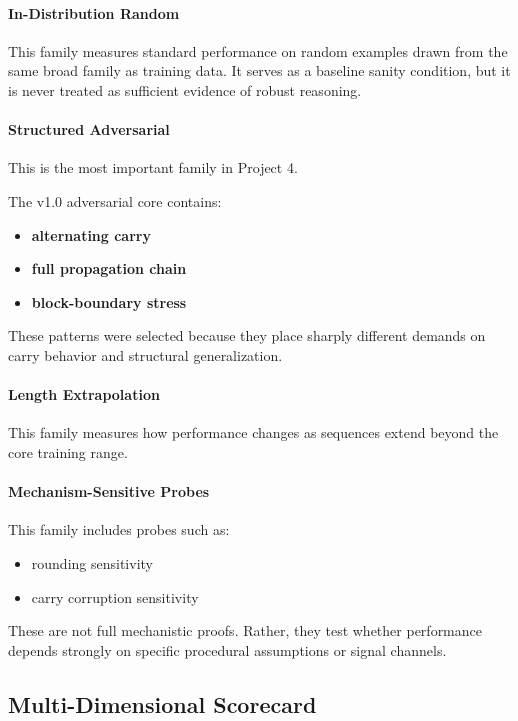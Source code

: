 \documentclass[11pt]{article}
\begin{document}
\paragraph{In-Distribution Random}
This family measures standard performance on random examples drawn from the same broad family as training data. It serves as a baseline sanity condition, but it is never treated as sufficient evidence of robust reasoning.

\paragraph{Structured Adversarial}
This is the most important family in Project 4.

The v1.0 adversarial core contains:
\begin{itemize}[leftmargin=1.5em]
    \item \textbf{alternating carry}
    \item \textbf{full propagation chain}
    \item \textbf{block-boundary stress}
\end{itemize}

These patterns were selected because they place sharply different demands on carry behavior and structural generalization.

\paragraph{Length Extrapolation}
This family measures how performance changes as sequences extend beyond the core training range.

\paragraph{Mechanism-Sensitive Probes}
This family includes probes such as:
\begin{itemize}[leftmargin=1.5em]
    \item rounding sensitivity
    \item carry corruption sensitivity
\end{itemize}

These are not full mechanistic proofs. Rather, they test whether performance depends strongly on specific procedural assumptions or signal channels.

\subsection{Multi-Dimensional Scorecard}
\end{document}
